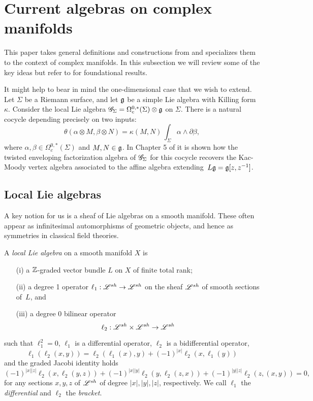 \section{Current algebras on complex manifolds}
\label{sec: fact}

This paper takes general definitions and constructions from \cite{CG1} and specializes them to the context of complex manifolds.
In this subsection we will review some of the key ideas but refer to \cite{CG1} for foundational results.

\begin{rmk}
It might help to bear in mind the one-dimensional case that we wish to extend. 
Let $\Sigma$ be a Riemann surface, and let $\mathfrak g$ be a simple Lie algebra with Killing form $\kappa$.
Consider the local Lie algebra $\mathscr G_\Sigma = \Omega^{0,*}_c(\Sigma) \otimes \mathfrak g$ on $\Sigma$.
There is a natural cocycle depending precisely on two inputs:
\[
\theta( \alpha \otimes M, \beta \otimes N) = \kappa(M,N) \, \int_\Sigma \alpha \wedge \partial \beta  ,
\]
where $\alpha, \beta \in \Omega^{0,*}_c(\Sigma)$ and $M,N \in \mathfrak g$.
In Chapter 5 of \cite{CG1} it is shown how the twisted enveloping factorization algebra of $\mathscr G_\Sigma$ for this cocycle recovers the Kac-Moody vertex algebra associated to the affine algebra extending~$L\mathfrak g = \mathfrak g[z,z^{-1}]$.
\end{rmk}

\subsection{Local Lie algebras}

A key notion for us is a sheaf of Lie algebras on a smooth manifold.
These often appear as infinitesimal automorphisms of geometric objects,
and hence as symmetries in classical field theories.

\begin{dfn} 
A {\em local Lie algebra} on a smooth manifold $X$ is 
\begin{itemize}
\item[(i)] a $\mathbb Z$-graded vector bundle $L$ on $X$ of finite total rank;
\item[(ii)] a degree 1 operator $\ell_1:\mathscr L^{sh} \to \mathscr L^{sh}$ on the sheaf $\mathscr L^{sh}$ of smooth sections of~$L$, and
\item[(iii)] a degree 0 bilinear operator
\[
\ell_2 : \mathscr L^{sh} \times \mathscr L^{sh} \to \mathscr L^{sh}
\]
\end{itemize}
such that $\ell_1^2 = 0$, $\ell_1$ is a differential operator, $\ell_2$ is a bidifferential operator,
\[
\ell_1(\ell_2(x,y)) = \ell_2(\ell_1(x), y) + (-1)^{|x|} \ell_2(x, \ell_1(y))
\]
and the graded Jacobi identity holds
\[
(-1)^{|x||z|} \ell_2(x,\ell_2(y,z)) + (-1)^{|x||y|} \ell_2(y, \ell_2(z,x)) + (-1)^{|y||z|} \ell_2(z,(x,y)) = 0,
\]
for any sections $x,y,z$ of $\mathscr L^{sh}$ of degree $|x|, |y|, |z|$, respectively. 
We call $\ell_1$ the {\em differential} and $\ell_2$ the {\em bracket}.
\end{dfn}

